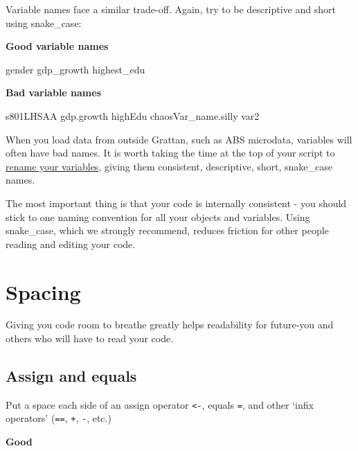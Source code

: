 \documentclass[]{book}
\newenvironment{Shaded}{\begin{snugshade}}{\end{snugshade}}
\newcommand{\NormalTok}[1]{#1}
\begin{document}
Variable names face a similar trade-off. Again, try to be descriptive and short using snake\_case:

\textbf{Good variable names}

\begin{Shaded}
\begin{Highlighting}[]
\NormalTok{gender}
\NormalTok{gdp_growth}
\NormalTok{highest_edu}
\end{Highlighting}
\end{Shaded}

\textbf{Bad variable names}

\begin{Shaded}
\begin{Highlighting}[]
\NormalTok{s801LHSAA}
\NormalTok{gdp.growth}
\NormalTok{highEdu}
\NormalTok{chaosVar_name.silly}
\NormalTok{var2}
\end{Highlighting}
\end{Shaded}

When you load data from outside Grattan, such as ABS microdata, variables will often have bad names. It is worth taking the time at the top of your script to \href{https://dplyr.tidyverse.org/reference/select.html}{rename your variables}, giving them consistent, descriptive, short, snake\_case names.

The most important thing is that your code is internally consistent - you should stick to one naming convention for all your objects and variables. Using snake\_case, which we strongly recommend, reduces friction for other people reading and editing your code.

\hypertarget{spacing}{%
\chapter{Spacing}\label{spacing}}

Giving you code room to breathe greatly helps readability for future-you and others who will have to read your code.

\hypertarget{assign-and-equals}{%
\section{Assign and equals}\label{assign-and-equals}}

Put a space each side of an assign operator \texttt{\textless{}-}, equals \texttt{=}, and other `infix operators' (\texttt{==}, \texttt{+}, \texttt{-}, etc.)

\textbf{Good}
\end{document}
